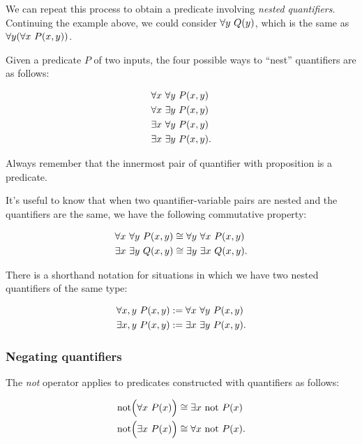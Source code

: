 We can repeat this process to obtain a predicate involving \textit{nested quantifiers}. Continuing the example above, we could consider $\forall y \text{ } Q(y)$, which is the same as $\forall y ( \forall x \text{ } P(x, y) )$.

Given a predicate $P$ of two inputs, the four possible ways to ``nest'' quantifiers are as follows:

\begin{align*}
    &\forall x \text{ } \forall y \text{ } P(x, y) \\
    &\forall x \text{ } \exists y \text{ } P(x, y) \\
    &\exists x \text{ } \forall y \text{ } P(x, y) \\
    &\exists x \text{ } \exists y \text{ } P(x, y).
\end{align*}

Always remember that the innermost pair of quantifier with proposition is a predicate.

It's useful to know that when two quantifier-variable pairs are nested and the quantifiers are the same, we have the following commutative property:

\begin{align*}
    &\forall x \text{ } \forall y \text{ } P(x, y) \cong \forall y \text{ } \forall x \text{ } P(x, y) \\
    &\exists x \text{ } \exists y \text{ } Q(x, y) \cong \exists y \text{ } \exists x \text{ } Q(x, y).
\end{align*}

There is a shorthand notation for situations in which we have two nested quantifiers of the same type:

\begin{align*}
    &\forall x, y \text{ } P(x, y) := \forall x \text{ } \forall y \text{ } P(x, y) \\
    &\exists x, y \text{ } P(x, y) := \exists x \text{ } \exists y \text{ } P(x, y).
\end{align*}

\subsubsection{Negating quantifiers}

The \textit{not} operator applies to predicates constructed with quantifiers as follows:

\begin{align*}
    \text{not}\Big( \forall x \text{ } P(x) \Big) &\cong \exists x \text{ } \text{not } P(x) \\
    \text{not}\Big( \exists x \text{ } P(x) \Big) &\cong \forall x \text{ } \text{not } P(x).
\end{align*}

